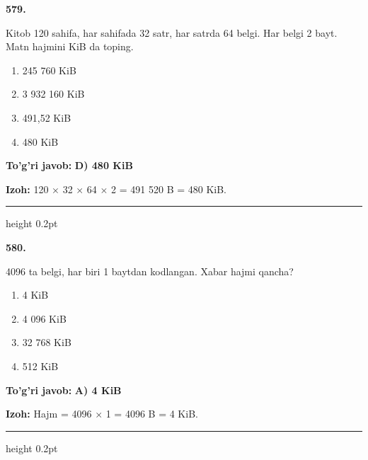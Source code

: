 \documentclass[10pt,a4paper,oneside]{article}
\begin{document}
\noindent\textbf{\color{ink}579.}
\par
Kitob 120 sahifa, har sahifada 32 satr, har satrda 64 belgi. Har belgi 2 bayt. Matn hajmini KiB da toping.
\begin{enumerate}[label=\Alph*),leftmargin=9mm]
\item 245 760 KiB
\item 3 932 160 KiB
\item 491,52 KiB
\item 480 KiB
\end{enumerate}
\begin{tcolorbox}[enhanced,breakable,colback=teal!4,colframe=teal!50!black,boxrule=0.5pt,arc=1.1mm,left=3mm,right=3mm,top=1.7mm,bottom=1.7mm,before skip=2mm,after skip=2mm]
\textbf{\color{teal}To'g'ri javob:} \textbf{D) 480 KiB}
\par\smallskip
\textbf{Izoh:} 120 \ensuremath{\times} 32 \ensuremath{\times} 64 \ensuremath{\times} 2 = 491 520 B = 480 KiB.
\end{tcolorbox}
\vspace{2mm}\hrule height 0.2pt \vspace{3mm}

\noindent\textbf{\color{ink}580.}
\par
4096 ta belgi, har biri 1 baytdan kodlangan. Xabar hajmi qancha?
\begin{enumerate}[label=\Alph*),leftmargin=9mm]
\item 4 KiB
\item 4 096 KiB
\item 32 768 KiB
\item 512 KiB
\end{enumerate}
\begin{tcolorbox}[enhanced,breakable,colback=teal!4,colframe=teal!50!black,boxrule=0.5pt,arc=1.1mm,left=3mm,right=3mm,top=1.7mm,bottom=1.7mm,before skip=2mm,after skip=2mm]
\textbf{\color{teal}To'g'ri javob:} \textbf{A) 4 KiB}
\par\smallskip
\textbf{Izoh:} Hajm = 4096 \ensuremath{\times} 1 = 4096 B = 4 KiB.
\end{tcolorbox}
\vspace{2mm}\hrule height 0.2pt \vspace{3mm}
\end{document}
